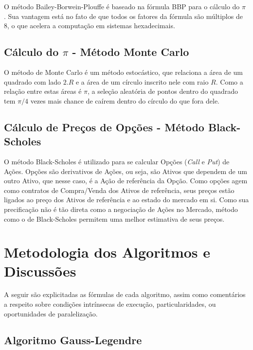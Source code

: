 \documentclass[12pt]{article}
\begin{document}
O método Bailey-Borwein-Plouffe é baseado na fórmula BBP para o cálculo do $\pi$
\cite{Bailey:97}.
Sua vantagem está no fato de que todos os fatores da fórmula são múltiplos de 8,
o que acelera a computação em sistemas hexadecimais.\\

\subsection{Cálculo do $\pi$ - Método Monte Carlo}

O método de Monte Carlo é um método estocástico, que relaciona a área de um quadrado com lado
$2.R$ e a área de um círculo inscrito nele com raio $R$. Como a relação entre estas áreas é
$\pi$, a seleção aleatória de pontos dentro do quadrado tem $\pi/4$ vezes mais chance de caírem
dentro do círculo do que fora dele.\\

\subsection{Cálculo de Preços de Opções - Método Black-Scholes}

O método Black-Scholes é utilizado para se calcular Opções (\textit{Call} e \textit{Put}) de
Ações. Opções são derivativos de Ações, ou seja, são Ativos que dependem de um outro Ativo,
que nesse caso, é a Ação de referência da Opção. Como opções agem como contratos de Compra/Venda
dos Ativos de referência, seus preços estão ligados ao preço dos Ativos de referência e ao
estado do mercado em si. Como sua precificação não é tão direta como a negociação de Ações no
Mercado, método como o de Black-Scholes permitem uma melhor estimativa de seus preços.\\

\section{Metodologia dos Algoritmos e Discussões} \label{sec:formulas}

A seguir são explicitadas as fórmulas de cada algoritmo, assim como comentários a respeito sobre
condições intrínsecas de execução, particularidades, ou oportunidades de paralelização.\\

\subsection{Algoritmo Gauss-Legendre}
\end{document}
